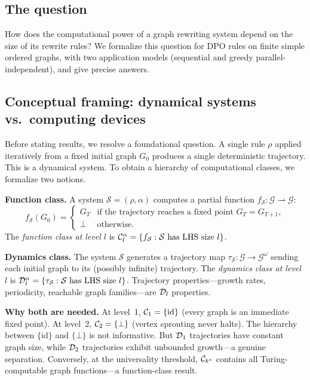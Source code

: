 \documentclass{../shared/primo}
\begin{document}
\subsection{The question}

How does the computational power of a graph rewriting system depend on the size of its rewrite rules? We formalize this question for DPO rules on finite simple ordered graphs, with two application models (sequential and greedy parallel-independent), and give precise answers.

\subsection{Conceptual framing: dynamical systems vs.\ computing devices}

Before stating results, we resolve a foundational question. A single rule $\rho$ applied iteratively from a fixed initial graph $G_0$ produces a single deterministic trajectory. This is a dynamical system. To obtain a hierarchy of computational classes, we formalize two notions.

\textbf{Function class.} A system $\mathcal{S} = (\rho, \alpha)$ computes a partial function $f_{\mathcal{S}}: \mathcal{G} \rightharpoonup \mathcal{G}$:
\[
f_{\mathcal{S}}(G_0) = \begin{cases} G_T & \text{if the trajectory reaches a fixed point } G_T = G_{T+1}, \\ \bot & \text{otherwise.} \end{cases}
\]
The \emph{function class at level $l$} is $\mathcal{C}_{l}^{\alpha} = \{f_{\mathcal{S}} : \mathcal{S} \text{ has LHS size } l\}$.

\textbf{Dynamics class.} The system $\mathcal{S}$ generates a trajectory map $\tau_{\mathcal{S}}: \mathcal{G} \to \mathcal{G}^{\omega}$ sending each initial graph to its (possibly infinite) trajectory. The \emph{dynamics class at level $l$} is $\mathcal{D}_{l}^{\alpha} = \{\tau_{\mathcal{S}} : \mathcal{S} \text{ has LHS size } l\}$. Trajectory properties---growth rates, periodicity, reachable graph families---are $\mathcal{D}_{l}$ properties.

\textbf{Why both are needed.} At level~1, $\mathcal{C}_{1} = \{\text{id}\}$ (every graph is an immediate fixed point). At level~2, $\mathcal{C}_{2} = \{\bot\}$ (vertex sprouting never halts). The hierarchy between $\{\text{id}\}$ and $\{\bot\}$ is not informative. But $\mathcal{D}_{1}$ trajectories have constant graph size, while $\mathcal{D}_{2}$ trajectories exhibit unbounded growth---a genuine separation. Conversely, at the universality threshold, $\mathcal{C}_{k^*}$ contains all Turing-computable graph functions---a function-class result.
\end{document}
